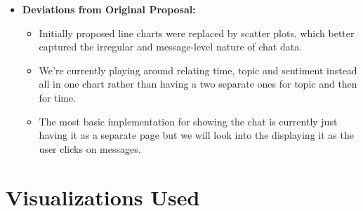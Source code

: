 \documentclass{article}\usepackage{graphicx}
\begin{document}
\begin{itemize}
    \item \textbf{Deviations from Original Proposal:}
    \begin{itemize}
        \item Initially proposed line charts were replaced by scatter plots, which better captured the irregular and message-level nature of chat data.
        \item We're currently playing around relating time, topic and sentiment instead all in one chart rather than having a two separate ones for topic and then for time.
        \item The most basic implementation for showing the chat is currently just having it as a separate page but we will look into the displaying it as the user clicks on messages. 
    \end{itemize}
\end{itemize}
 \section*{Visualizations Used}
\end{document}
